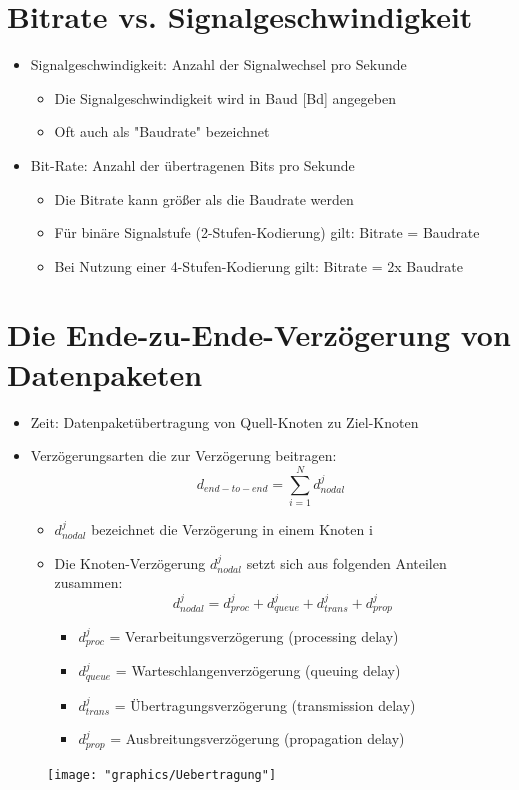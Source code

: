 \documentclass{scrreprt}
\begin{document}
\section{Bitrate vs. Signalgeschwindigkeit}
\begin{itemize}
	\item Signalgeschwindigkeit: Anzahl der Signalwechsel pro Sekunde
	      \begin{itemize}
		      \item Die Signalgeschwindigkeit wird in Baud [Bd] angegeben
		      \item Oft auch als "Baudrate" bezeichnet
	      \end{itemize}
	\item Bit-Rate: Anzahl der übertragenen Bits pro Sekunde
	      \begin{itemize}
		      \item Die Bitrate kann größer als die Baudrate werden
		      \item Für binäre Signalstufe (2-Stufen-Kodierung) gilt: Bitrate = Baudrate
		      \item Bei Nutzung einer 4-Stufen-Kodierung gilt: Bitrate = 2x Baudrate
	      \end{itemize}
\end{itemize}

\section{Die Ende-zu-Ende-Verzögerung von Datenpaketen}
\begin{itemize}
	\item Zeit: Datenpaketübertragung von Quell-Knoten zu Ziel-Knoten
	\item Verzögerungsarten die zur Verzögerung beitragen:
	      \\$$d_{end-to-end} = \sum_{i=1}^{N}{d^{j}_{nodal}}$$
	      \begin{itemize}
		      \item $d^{j}_{nodal}$ bezeichnet die Verzögerung in einem Knoten i
		      \item Die Knoten-Verzögerung $d^{j}_{nodal}$ setzt sich aus folgenden Anteilen zusammen:
		            \\$$d^{j}_{nodal} = d^{j}_{proc}+d^{j}_{queue}+d^{j}_{trans}+d^{j}_{prop}$$
		            \begin{itemize}
			            \item $d^{j}_{proc}$ = Verarbeitungsverzögerung (processing delay)
			            \item $d^{j}_{queue}$ = Warteschlangenverzögerung (queuing delay)
			            \item $d^{j}_{trans}$ = Übertragungsverzögerung (transmission delay)
			            \item $d^{j}_{prop}$ = Ausbreitungsverzögerung (propagation delay)
		            \end{itemize}
	      \end{itemize}
\end{itemize}
\begin{figure}[h]
	\texttt{[image: "graphics/Uebertragung"]}
	\centering
\end{figure}
\end{document}
